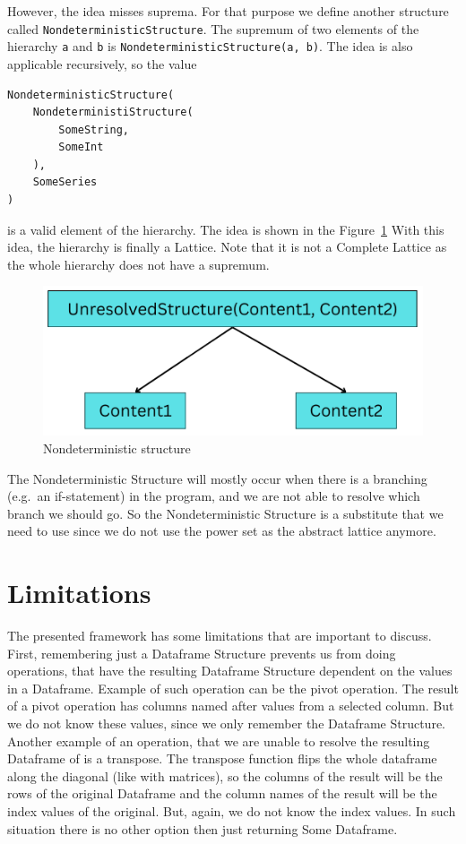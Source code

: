However, the idea misses suprema.
For that purpose we define another structure called \verb|NondeterministicStructure|.
The supremum of two elements of the hierarchy \verb|a| and \verb|b| is \verb|NondeterministicStructure(a, b)|.
The idea is also applicable recursively, so the value \\
\begin{verbatim}
NondeterministicStructure(
    NondeterministiStructure(
        SomeString,
        SomeInt
    ),
    SomeSeries
)
\end{verbatim}
is a valid element of the hierarchy.
The idea is shown in the Figure~\ref{fig:nondeterministic_structure}
With this idea, the hierarchy is finally a Lattice.
Note that it is not a Complete Lattice as the whole hierarchy does not have a supremum.

\begin{figure}[H]
    \caption{Nondeterministic structure}
    \label{fig:nondeterministic_structure}
    \centering
    \includegraphics[scale=0.5]{img/unresolved_structure}
\end{figure}

The Nondeterministic Structure will mostly occur when there is a branching (e.g.~an if-statement) in the program, and we are not
able to resolve which branch we should go.
So the Nondeterministic Structure is a substitute that we need to use since we do not use the power set as the abstract
lattice anymore.


\section{Limitations}

The presented framework has some limitations that are important to discuss.
First, remembering just a Dataframe Structure prevents us from doing operations, that have the resulting Dataframe
Structure dependent on the values in a Dataframe.
Example of such operation can be the pivot operation.
The result of a pivot operation has columns named after values from a selected column.
But we do not know these values, since we only remember the Dataframe Structure.
Another example of an operation, that we are unable to resolve the resulting Dataframe of is a transpose.
The transpose function flips the whole dataframe along the diagonal (like with matrices), so the columns of the result
will be the rows of the original Dataframe and the column names of the result will be the index values of the original.
But, again, we do not know the index values.
In such situation there is no other option then just returning Some Dataframe.

